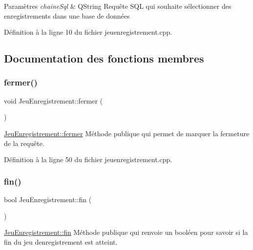 \begin{DoxyParams}{Paramètres}
{\em chaine\+Sql} & Q\+String Requête S\+QL qui souhaite sélectionner des enregistrements dans une base de données \\
\hline
\end{DoxyParams}


Définition à la ligne 10 du fichier jeuenregistrement.\+cpp.



\subsection{Documentation des fonctions membres}
\mbox{\label{class_jeu_enregistrement_a25a6ae0b1b810abaeef0acb9876ecbaf}} 
\subsubsection{\texorpdfstring{fermer()}{fermer()}}
{\footnotesize\ttfamily void Jeu\+Enregistrement\+::fermer (\begin{DoxyParamCaption}{ }\end{DoxyParamCaption})}



\hyperlink{class_jeu_enregistrement_a25a6ae0b1b810abaeef0acb9876ecbaf}{Jeu\+Enregistrement\+::fermer} Méthode publique qui permet de marquer la fermeture de la requête. 



Définition à la ligne 50 du fichier jeuenregistrement.\+cpp.

\mbox{\label{class_jeu_enregistrement_af8d23fbc407926e8578986a3e950bdd9}} 
\subsubsection{\texorpdfstring{fin()}{fin()}}
{\footnotesize\ttfamily bool Jeu\+Enregistrement\+::fin (\begin{DoxyParamCaption}{ }\end{DoxyParamCaption})}



\hyperlink{class_jeu_enregistrement_af8d23fbc407926e8578986a3e950bdd9}{Jeu\+Enregistrement\+::fin} Méthode publique qui renvoie un booléen pour savoir si la fin du jeu d\textquotesingle{}enregistrement est atteint. 


